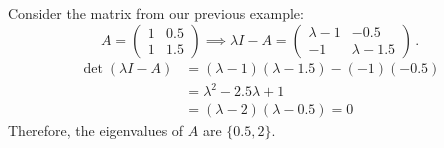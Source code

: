 \documentclass[xcolor=table]{beamer}
\begin{document}
	\begin{frame}
		\begin{example}
			Consider the matrix from our previous example:
			\begin{equation*}
				A=\begin{pmatrix}1 & 0.5\\1 & 1.5\end{pmatrix}\implies\lambda I-A=\begin{pmatrix}\lambda-1 & -0.5\\-1 & \lambda-1.5\end{pmatrix}\,.
			\end{equation*}
			\begin{align*}
				\det(\lambda I-A) & =(\lambda-1)(\lambda-1.5)-(-1)(-0.5)\\
				& =\lambda^2-2.5\lambda+1\\
				& =(\lambda-2)(\lambda-0.5)=0
			\end{align*}
		Therefore, the eigenvalues of $A$ are $\{0.5,2\}$.
		\end{example}
	\end{frame}
	
\end{document}
